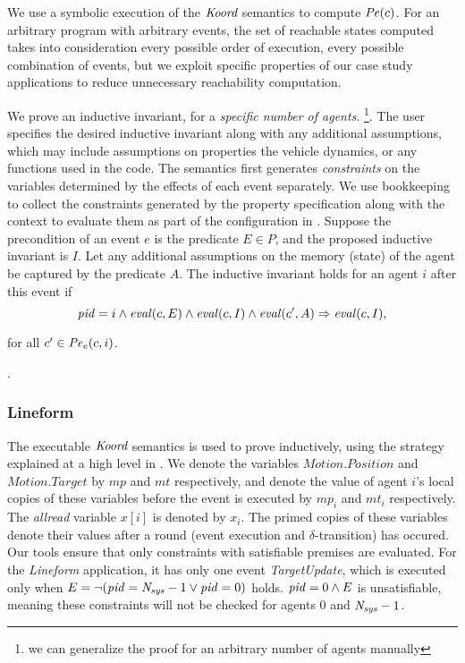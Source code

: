 We use a symbolic execution of the $\emph{Koord}$ semantics to compute $\mathit{Pe}(c)$. For an arbitrary program with arbitrary events, the set of reachable states computed takes into consideration every possible order of execution, every possible combination of events, but we exploit specific properties of our case study applications to reduce unnecessary reachability computation. 

     We prove an inductive invariant, for a \emph{specific number of agents}. \footnote{we can generalize the proof for an arbitrary number of agents manually}. The user specifies the desired inductive invariant along with any additional assumptions, which may include assumptions on properties the vehicle dynamics, or any functions used in the code. The semantics first generates \emph{constraints} on the variables determined by the effects of each event separately. We use bookkeeping to collect the constraints generated by the property specification along with the context to evaluate them as part of the configuration in \K. Suppose the precondition of an event $e$ is the predicate $E \in P$, and the proposed inductive invariant is $I$. Let any additional assumptions on the memory (state) of the agent be captured by the predicate $A$. The inductive invariant holds for an agent $i$ after this event if
            $$\mathit{pid} = i \wedge \mathit{eval}(c,E)\wedge \mathit{eval}(c,I)\wedge \mathit{eval}(c',A)\Rightarrow \mathit{eval}(c,I),$$

for all $c' \in \mathit{Pe}_e(c,i)$.



 .

\subsubsection*{Lineform}
The executable $\emph{Koord}$ semantics is used to prove  inductively, using the strategy explained at a high level in . We denote the variables $\mathit{Motion.Position}$ and $\mathit{Motion.Target}$ by $\mathit{mp}$ and $\mathit{mt}$ respectively,  and denote the value of agent $i$'s local copies of these variables before the event is executed by $\mathit{mp}_i$ and $\mathit{mt}_i$ respectively. The \emph{allread} variable $x[i]$ is denoted by $x_i$. The primed copies of these variables denote their values after a round (event execution and $\delta$-transition) has occured. Our tools ensure that only constraints with satisfiable premises are evaluated. For the \emph{Lineform} application, it has only one event \emph{TargetUpdate}, which is executed only when $E =\neg (\mathit{pid} = \mathit{N_{sys}} - 1 \vee \mathit{pid} = 0)$ holds. $\mathit{pid} = 0 \wedge E$ is unsatisfiable, meaning these constraints will not be checked for agents $0$ and $\mathit{N_{sys}} - 1$.


